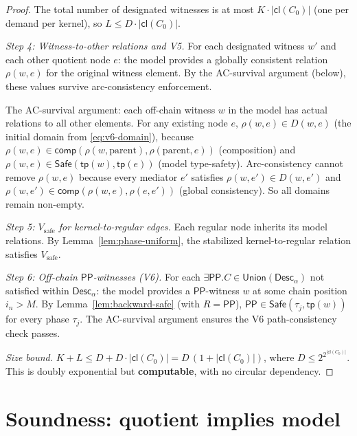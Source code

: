 \documentclass[a4paper,11pt]{article}
\theoremstyle{definition}
\newcommand{\PP}{\ensuremath{\mathsf{PP}}}
\newcommand{\comp}{\ensuremath{\mathsf{comp}}}
\newcommand{\cl}{\ensuremath{\mathsf{cl}}}
\newcommand{\tp}{\ensuremath{\mathsf{tp}}}
\newcommand{\Desc}{\ensuremath{\mathsf{Desc}}}
\newcommand{\Union}{\ensuremath{\mathsf{Union}}}
\newcommand{\Safe}{\ensuremath{\mathsf{Safe}}}
\begin{document}
\begin{proof}
\medskip
The total number of designated witnesses is at most
$K \cdot |\cl(C_0)|$ (one per demand per kernel), so
$L \le D \cdot |\cl(C_0)|$.

\medskip\noindent\textit{Step 4: Witness-to-other relations and
V5.}\;
For each designated witness $w'$ and each other quotient node $e$:
the model provides a globally consistent relation $\rho(w, e)$ for
the original witness element.  By the AC-survival argument (below),
these values survive arc-consistency enforcement.

The AC-survival argument: each off-chain witness $w$ in the model
has actual relations to all other elements.  For any existing node
$e$, $\rho(w, e) \in D(w, e)$ (the initial domain from
\eqref{eq:v6-domain}), because $\rho(w, e) \in
\comp(\rho(w, \text{parent}), \rho(\text{parent}, e))$ (composition)
and $\rho(w, e) \in \Safe(\tp(w), \tp(e))$ (model type-safety).
Arc-consistency cannot remove $\rho(w, e)$ because every mediator
$e'$ satisfies $\rho(w, e') \in D(w, e')$ and
$\rho(w, e') \in \comp(\rho(w, e), \rho(e, e'))$ (global
consistency).  So all domains remain non-empty.

\medskip\noindent\textit{Step 5: $V_{\mathrm{safe}}$ for
kernel-to-regular edges.}\;
Each regular node inherits its model relations.  By
Lemma~\ref{lem:phase-uniform}, the stabilized kernel-to-regular
relation satisfies $V_{\mathrm{safe}}$.

\medskip\noindent\textit{Step 6: Off-chain $\PP$-witnesses (V6).}\;
For each $\exists\PP.C \in \Union(\Desc_\alpha)$ not satisfied
within $\Desc_\alpha$: the model provides a $\PP$-witness $w$
at some chain position $i_n > M$.  By
Lemma~\ref{lem:backward-safe} (with $R = \PP$),
$\PP \in \Safe(\tau_j, \tp(w))$ for every phase $\tau_j$.
The AC-survival argument ensures the V6 path-consistency check
passes.

\medskip\noindent\textit{Size bound.}\;
$K + L \le D + D \cdot |\cl(C_0)| = D\,(1 + |\cl(C_0)|)$,
where $D \le 2^{2^{|\cl(C_0)|}}$.  This is doubly exponential but
\textbf{computable}, with no circular dependency.
\end{proof}


\section{Soundness: quotient implies model}\label{sec:soundness}
\end{document}
